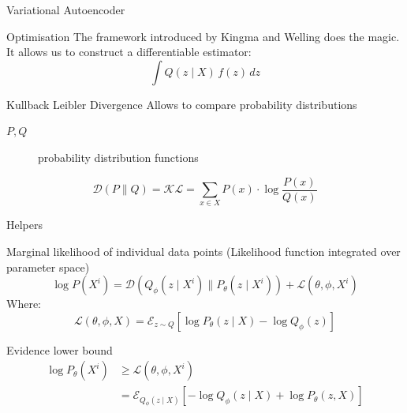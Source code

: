\documentclass{beamer}
\begin{document}
\begin{frame}{Variational Autoencoder}
    \begin{block}{Optimisation}
        The framework introduced by Kingma and Welling \cite{1312.6114} does the magic.
        It allows us to construct a differentiable estimator:
        \begin{equation}
            \int Q(z\mid X)\, f(z) \, dz
        \end{equation}
    \end{block}
    \begin{block}{Kullback Leibler Divergence}
        Allows to compare probability distributions
        \begin{description}
            \item[$P, Q$] probability distribution functions
        \end{description}
        \begin{equation}
            \mathcal{D}(P\parallel Q) = \mathcal{KL} = \sum_{x \in X} P(x) \cdot \log \frac{P(x)}{Q(x)}
        \end{equation}
    \end{block}
\end{frame}

\begin{frame}{Helpers}
    
    \begin{block}{Marginal likelihood of individual data points}
        (Likelihood function integrated over parameter space)
        \begin{equation}
            \log P\left(X^i\right) = \mathcal{D}\left( Q_\phi \left(z \mid X^i \right) \parallel P_\theta \left(z \mid
                X^i\right) \right) +\mathcal{L}  \left(\theta , \phi , X^i\right)
        \end{equation}
        Where:
        \begin{equation}
                \mathcal{L} (\theta , \phi , X) =
                \mathcal{E}_{z\sim Q} \left[\log P_\theta(z\mid X)-\log Q_\phi(z) \right]
        \end{equation}
    \end{block}
    \begin{block}{Evidence lower bound}
        \begin{equation}
            \begin{split}
                \log P_\theta \left(X^i\right) & \geq \mathcal{L} \left(\theta , \phi , X^i\right) \\
                                               &= \mathcal{E}_{Q_\phi (z\mid X)} \left[ -\log 
                                               Q_\phi(z \mid X) + \log P_\theta(z, X) \right]
            \end{split}
        \end{equation}
    \end{block}
\end{frame}
\end{document}
